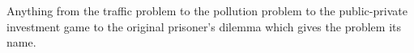 \documentclass{article}
\newcommand{\mybigskip}{\vspace{1in}}
\newcommand{\myitem}{\item (5 points)\ }
\begin{document}
\begin{enumerate}
\begin{enumerate}
    \begin{KEY} Anything from the traffic problem to the pollution problem to the public-private investment game to the original prisoner's dilemma which gives the problem its name. %
\end{KEY}
    \end{enumerate}

















\begin{comment}
\item ``A Pareto efficient outcome may not be good, but a Pareto inefficient outcome is in some meaningful sense bad."

    \begin{enumerate}
    \myitem Give an example or otherwise explain, as if to a non-economist, the first part of this sentence, ``A Pareto efficient outcome may not be good."

\begin{EXAM} \mybigskip \end{EXAM}

\begin{KEY}
A Pareto efficient allocation of resources may not be good because of equity concerns or other considerations. For example, it would be Pareto efficient for Bill Gates to own everything (or for one kid to get the whole cake), but we might not find these to be very appealing resource allocations.
\end{KEY}

    \myitem Give an example or otherwise explain, as if to a non-economist, the second part of this sentence, ``A Pareto inefficient outcome is in some meaningful sense bad."

\begin{EXAM} \mybigskip \end{EXAM}


\end{comment}
\end{enumerate}
\end{document}
